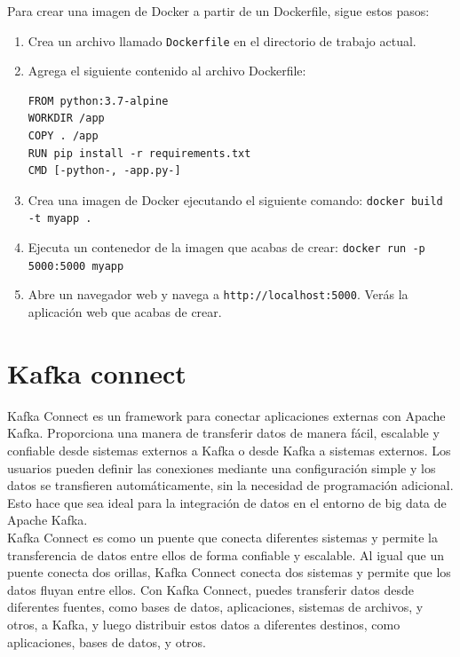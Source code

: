 \documentclass{article}
\begin{document}
Para crear una imagen de Docker a partir de un Dockerfile, sigue estos pasos:

\begin{enumerate}
\item Crea un archivo llamado \lstinline{Dockerfile} en el directorio de trabajo actual.
\item Agrega el siguiente contenido al archivo Dockerfile:

\begin{lstlisting}[numbers=none]
FROM python:3.7-alpine
WORKDIR /app
COPY . /app
RUN pip install -r requirements.txt
CMD [-python-, -app.py-]
\end{lstlisting}
\item Crea una imagen de Docker ejecutando el siguiente comando: \lstinline{docker build -t myapp .}
\item Ejecuta un contenedor de la imagen que acabas de crear: \lstinline{docker run -p 5000:5000 myapp}
\item Abre un navegador web y navega a \lstinline{http://localhost:5000}. Verás la aplicación web que acabas de crear.
\end{enumerate}

\newpage
\section{Kafka connect}
Kafka Connect es un framework para conectar aplicaciones externas con Apache Kafka. Proporciona una manera de transferir datos de manera fácil, escalable y confiable desde sistemas externos a Kafka o desde Kafka a sistemas externos. Los usuarios pueden definir las conexiones mediante una configuración simple y los datos se transfieren automáticamente, sin la necesidad de programación adicional. Esto hace que sea ideal para la integración de datos en el entorno de big data de Apache Kafka.\\

Kafka Connect es como un puente que conecta diferentes sistemas y permite la transferencia de datos entre ellos de forma confiable y escalable. Al igual que un puente conecta dos orillas, Kafka Connect conecta dos sistemas y permite que los datos fluyan entre ellos. Con Kafka Connect, puedes transferir datos desde diferentes fuentes, como bases de datos, aplicaciones, sistemas de archivos, y otros, a Kafka, y luego distribuir estos datos a diferentes destinos, como aplicaciones, bases de datos, y otros.
\end{document}

